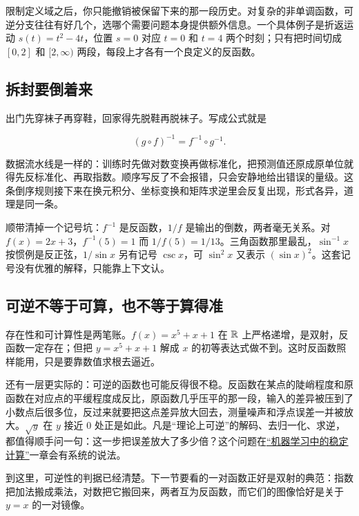 限制定义域之后，你只能撤销被保留下来的那一段历史。对复杂的非单调函数，可逆分支往往有好几个，选哪个需要问题本身提供额外信息。一个具体例子是折返运动 \(s(t)=t^2-4t\)，位置 \(s=0\) 对应 \(t=0\) 和 \(t=4\) 两个时刻；只有把时间切成 \([0,2]\) 和 \([2,\infty)\) 两段，每段上才各有一个良定义的反函数。

\subsection{拆封要倒着来}

出门先穿袜子再穿鞋，回家得先脱鞋再脱袜子。写成公式就是

\[
(g\circ f)^{-1}=f^{-1}\circ g^{-1}.
\]

数据流水线是一样的：训练时先做对数变换再做标准化，把预测值还原成原单位就得先反标准化、再取指数。顺序写反了不会报错，只会安静地给出错误的量级。这条倒序规则接下来在换元积分、坐标变换和矩阵求逆里会反复出现，形式各异，道理是同一条。

顺带清掉一个记号坑：\(f^{-1}\) 是反函数，\(1/f\) 是输出的倒数，两者毫无关系。对 \(f(x)=2x+3\)，\(f^{-1}(5)=1\) 而 \(1/f(5)=1/13\)。三角函数那里最乱，\(\sin^{-1}x\) 按惯例是反正弦，\(1/\sin x\) 另有记号 \(\csc x\)，可 \(\sin^2x\) 又表示 \((\sin x)^2\)。这套记号没有优雅的解释，只能靠上下文认。

\subsection{可逆不等于可算，也不等于算得准}

存在性和可计算性是两笔账。\(f(x)=x^5+x+1\) 在 \(\mathbb{R}\) 上严格递增，是双射，反函数一定存在；但把 \(y=x^5+x+1\) 解成 \(x\) 的初等表达式做不到。这时反函数照样能用，只是要靠数值求根去逼近。

还有一层更实际的：可逆的函数也可能反得很不稳。反函数在某点的陡峭程度和原函数在对应点的平缓程度成反比，原函数几乎压平的那一段，输入的差异被压到了小数点后很多位，反过来就要把这点差异放大回去，测量噪声和浮点误差一并被放大。\(\sqrt y\) 在 \(y\) 接近 \(0\) 处正是如此。凡是``理论上可逆''的解码、去归一化、求逆，都值得顺手问一句：这一步把误差放大了多少倍？这个问题在\hyperref[ch:067]{``机器学习中的稳定计算''}一章会有系统的说法。

到这里，可逆性的判据已经清楚。下一节要看的一对函数正好是双射的典范：指数把加法搬成乘法，对数把它搬回来，两者互为反函数，而它们的图像恰好是关于 \(y=x\) 的一对镜像。
